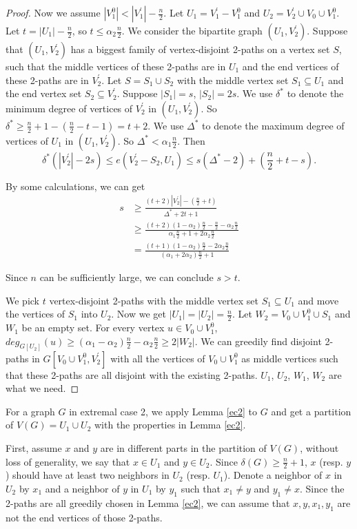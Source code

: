 \documentclass[11pt]{article}
\begin{document}
\begin{proof}
Now we assume $|V_1^0|< |V_1^{'}|-\frac{n}{2}$. Let $U_1=V_1^{'}-V_1^0$ and $U_2=V_2^{'}\cup V_0\cup V_1^0$. Let $t=|U_1|-\frac{n}{2}$, so $t\leq \alpha_2\frac{n}{2}$. We consider the bipartite graph $(U_1,V_2^{'})$. Suppose that $(U_1,V_2^{'})$ has a biggest family of vertex-disjoint 2-paths on a vertex set $S$, such that the middle vertices of these 2-paths are in $U_1$ and the end vertices of these 2-paths are in $V_2^{'}$. Let $S=S_1\cup S_2$ with the middle vertex set $S_1\subseteq U_1$ and the end vertex set $S_2\subseteq V_2^{'}$. Suppose $|S_1|=s$, $|S_2|=2s$. We use $\delta^{*}$ to denote the minimum degree of vertices of  $V_2^{'}$ in $(U_1,V_2^{'})$. So $\delta^{*}\geq \frac{n}{2}+1-(\frac{n}{2}-t-1)=t+2$. We use $\Delta^{*}$ to denote the maximum degree of vertices of $U_1$ in $(U_1,V_2^{'})$. So $\Delta^{*}< \alpha_1\frac{n}{2}$. Then $$\delta^{*}(|V_2^{'}|-2s)\leq e(V_2^{'}-S_2,U_1)\leq s(\Delta^*-2)+(\frac{n}{2}+t-s).$$

By some calculations, we can get
\begin{align*}
s &\geq \frac{(t+2)|V_2^{'}|-(\frac{n}{2}+t)}{\Delta^*+2t+1}\\
  &\geq \frac{(t+2)(1-\alpha_2)\frac{n}{2}-\frac{n}{2}-\alpha_2\frac{n}{2}}{\alpha_1\frac{n}{2}+1+2\alpha_2\frac{n}{2}} \\
  &=\frac{(t+1)(1-\alpha_2)\frac{n}{2}-2\alpha_2\frac{n}{2}}{(\alpha_1+2\alpha_2)\frac{n}{2}+1}
\end{align*}

Since $n$ can be sufficiently large, we can conclude $s>t$.

We pick $t$ vertex-disjoint 2-paths with the middle vertex set $S_1\subseteq U_1$ and move the vertices of $S_1$ into $U_2$. Now we get $|U_1|=|U_2|=\frac{n}{2}$. Let $W_2=V_0\cup V_1^0\cup S_1$ and $W_1$ be an empty set. For every vertex $u\in V_0\cup V_1^0$, $deg_{G[U_2]}(u)\geq (\alpha_1-\alpha_2)\frac{n}{2}-\alpha_2\frac{n}{2}\geq 2|W_2|$. We can greedily find disjoint 2-paths in $G[V_0\cup V_1^0,V_2^{'}]$ with all the vertices of $V_0\cup V_1^0$ as middle vertices such that these 2-paths are all disjoint with the existing 2-paths. $U_1$, $U_2$, $W_1$, $W_2$ are what we need.
\end{proof}

For a graph $G$ in extremal case 2, we apply Lemma \ref{ec2} to $G$ and get a partition of $V(G)=U_1\cup U_2$ with the properties in Lemma \ref{ec2}.

First, assume $x$ and $y$ are in different parts in the partition of $V(G)$, without loss of generality, we say that $x\in U_1$ and $y\in U_2$. Since $\delta(G)\geq \frac{n}{2}+1$, $x$ (resp. $y$) should have at least two neighbors in $U_2$ (resp. $U_1$). Denote a neighbor of $x$ in $U_2$ by $x_1$ and a neighbor of $y$ in $U_1$ by $y_1$ such that $x_1\not =y$ and $y_1\not =x$. Since the 2-paths are all greedily chosen in Lemma \ref{ec2}, we can assume that $x,y,x_1,y_1$ are not the end vertices of those 2-paths.
\end{document}
